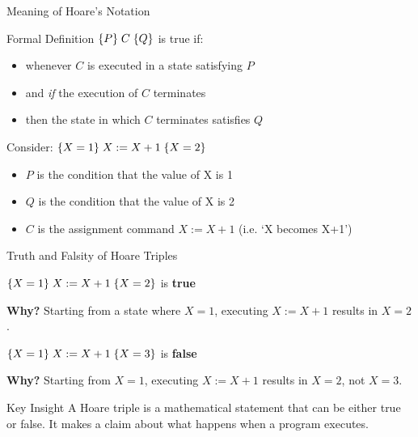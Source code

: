 \begin{frame}{Meaning of Hoare's Notation}
    \begin{block}{Formal Definition}
        $\{P\}\; C\; \{Q\}$ is true if:
        \begin{itemize}
            \item whenever $C$ is executed in a state satisfying $P$
            \item and \emph{if} the execution of $C$ terminates
            \item then the state in which $C$ terminates satisfies $Q$
        \end{itemize}
    \end{block}
    
    \begin{example}
        Consider: $\{X = 1\}\; X := X + 1\; \{X = 2\}$
        \begin{itemize}
            \item $P$ is the condition that the value of X is 1
            \item $Q$ is the condition that the value of X is 2
            \item $C$ is the assignment command $X := X + 1$ (i.e. `X becomes X+1')
        \end{itemize}
    \end{example}
\end{frame}

\begin{frame}{Truth and Falsity of Hoare Triples}
    \begin{example}
        $\{X = 1\}\; X := X + 1\; \{X = 2\}$ is \textbf{true}
        
        \textbf{Why?} Starting from a state where $X = 1$, executing $X := X + 1$ results in $X = 2$.
    \end{example}
    
    \begin{example}
        $\{X = 1\}\; X := X + 1\; \{X = 3\}$ is \textbf{false}
        
        \textbf{Why?} Starting from $X = 1$, executing $X := X + 1$ results in $X = 2$, not $X = 3$.
    \end{example}
    
    \begin{alertblock}{Key Insight}
        A Hoare triple is a mathematical statement that can be either true or false. It makes a claim about what happens when a program executes.
    \end{alertblock}
\end{frame}